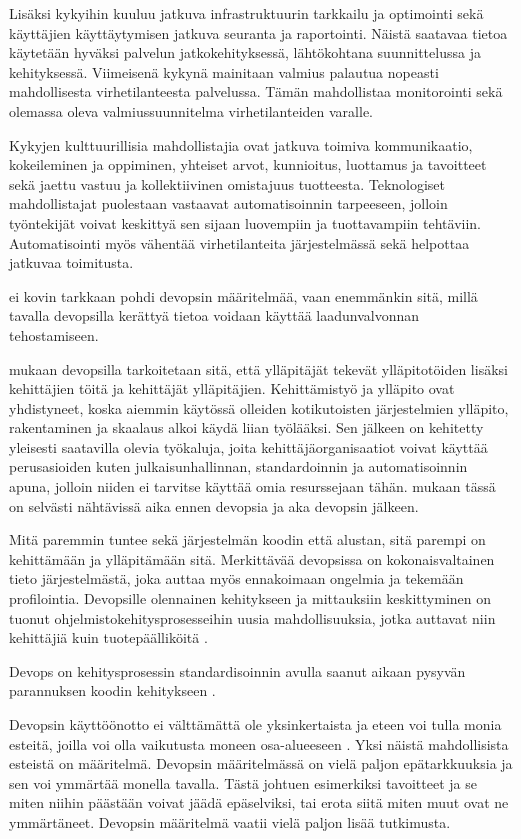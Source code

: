 \documentclass[finnish]{tktltiki2}
\theoremstyle{definition}
\theoremstyle{remark}
\begin{document}
Lisäksi kykyihin kuuluu jatkuva infrastruktuurin tarkkailu ja optimointi sekä käyttäjien käyttäytymisen jatkuva seuranta ja raportointi. Näistä saatavaa tietoa käytetään hyväksi palvelun jatkokehityksessä, lähtökohtana suunnittelussa ja kehityksessä. Viimeisenä kykynä mainitaan valmius palautua nopeasti mahdollisesta virhetilanteesta palvelussa. Tämän mahdollistaa monitorointi sekä olemassa oleva valmiussuunnitelma virhetilanteiden varalle.

Kykyjen kulttuurillisia mahdollistajia ovat jatkuva toimiva kommunikaatio, kokeileminen ja oppiminen, yhteiset arvot, kunnioitus, luottamus ja tavoitteet sekä jaettu vastuu ja kollektiivinen omistajuus tuotteesta. Teknologiset mahdollistajat puolestaan vastaavat automatisoinnin tarpeeseen, jolloin työntekijät voivat keskittyä sen sijaan luovempiin ja tuottavampiin tehtäviin. Automatisointi myös vähentää virhetilanteita järjestelmässä sekä helpottaa jatkuvaa toimitusta.

\textcite{roche13} ei kovin tarkkaan pohdi devopsin määritelmää, vaan enemmänkin sitä, millä tavalla devopsilla kerättyä tietoa voidaan käyttää laadunvalvonnan tehostamiseen.

\textcite{roche13} mukaan devopsilla tarkoitetaan sitä, että ylläpitäjät tekevät ylläpitotöiden lisäksi kehittäjien töitä ja kehittäjät ylläpitäjien. Kehittämistyö ja ylläpito ovat yhdistyneet, koska aiemmin käytössä olleiden kotikutoisten järjestelmien ylläpito, rakentaminen ja skaalaus alkoi käydä liian työlääksi. Sen jälkeen on kehitetty yleisesti saatavilla olevia työkaluja, joita kehittäjäorganisaatiot voivat käyttää perusasioiden kuten julkaisunhallinnan, standardoinnin ja automatisoinnin apuna, jolloin niiden ei tarvitse käyttää omia resurssejaan tähän. \parencite{roche13} mukaan tässä on selvästi nähtävissä aika ennen devopsia ja aka devopsin jälkeen.

Mitä paremmin tuntee sekä järjestelmän koodin että alustan, sitä parempi on kehittämään ja ylläpitämään sitä. Merkittävää devopsissa on kokonaisvaltainen tieto järjestelmästä, joka auttaa myös ennakoimaan ongelmia ja tekemään profilointia. Devopsille olennainen kehitykseen ja mittauksiin keskittyminen on tuonut ohjelmistokehitysprosesseihin uusia mahdollisuuksia, jotka auttavat niin kehittäjiä kuin tuotepäälliköitä \parencite{roche13}.

Devops on kehitysprosessin standardisoinnin avulla saanut aikaan pysyvän parannuksen koodin kehitykseen \parencite{roche13}.

Devopsin käyttöönotto ei välttämättä ole yksinkertaista ja eteen voi tulla monia esteitä, joilla voi olla vaikutusta moneen osa-alueeseen \parencite{smeds15}. Yksi näistä mahdollisista esteistä on määritelmä. Devopsin määritelmässä on vielä paljon epätarkkuuksia ja sen voi ymmärtää monella tavalla. Tästä johtuen esimerkiksi tavoitteet ja se miten niihin päästään voivat jäädä epäselviksi, tai erota siitä miten muut ovat ne ymmärtäneet. Devopsin määritelmä vaatii vielä paljon lisää tutkimusta.
\end{document}
